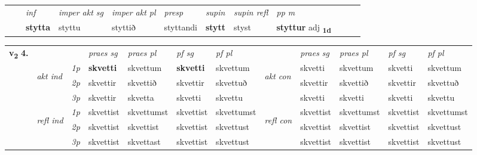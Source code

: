 \begin{tabular}{llllllllllll}
 & & \textit{inf} & \textit{imper akt sg} & \textit{imper akt pl}   & \textit{presp} & \textit{supin} & \textit{supin refl} & \textit{pp m}     \\*
  & & \textbf{stytta} & styttu  & styttið   & styttandi &  \textbf{stytt} & styst & \textbf{styttur} adj \textbf{\textsubscript{1d}} \\*
\cmidrule{1-12}
\end{tabular}



\begin{tabular}{llllllllllll} \toprule
\multirow{4}{*}{{{\textbf{v{\textsubscript{2}}} \Large{\textbf{4.}}}}}  & &   &  \textit{praes sg}  & \textit{praes pl}  &\textit{ pf sg} & \textit{pf pl} &  &  \textit{praes sg}  & \textit{praes pl}  & \textit{pf sg} & \textit{pf pl } \\*
	\cmidrule{4-7} \cmidrule{9-12}
 & \multirow{3}{*}{\begin{turn}{90}\textit{akt ind}\end{turn}} & {\textit{1p}} & \textbf{skvetti} & skvettum    & \textbf{skvetti} & skvettum & \multirow{3}{*}{\begin{turn}{90}\textit{akt con}\end{turn}} &skvetti & skvettum & skvetti & skvettum\\*
& &  {\textit{2p}} &  skvettir  & skvettið   & skvettir & skvettuð & & skvettir & skvettið & skvettir & skvettuð \\*
& &  {\textit{3p}} & skvettir & skvetta   & skvetti & skvettu & & skvetti & skvetti& skvetti & skvettu  \\*
\cmidrule{4-7} \cmidrule{9-12}
 &\multirow{3}{*}{\begin{turn}{90}\textit{refl ind}\end{turn}} & {\textit{1p}} & skvettist & skvettumst    & skvettist & skvettumst & \multirow{3}{*}{\begin{turn}{90}\textit{refl con}\end{turn}}  &skvettist & skvettumst & skvettist & skvettumst\\*
 &&  {\textit{2p}} &  skvettist  & skvettist   & skvettist & skvettust & &skvettist & skvettist & skvettist & skvettust \\*
& &  {\textit{3p}} & skvettist & skvettast   & skvettist & skvettust & & skvettist & skvettist& skvettist & skvettust  \\*
\cmidrule{4-7} \cmidrule{9-12}
\end{tabular}


